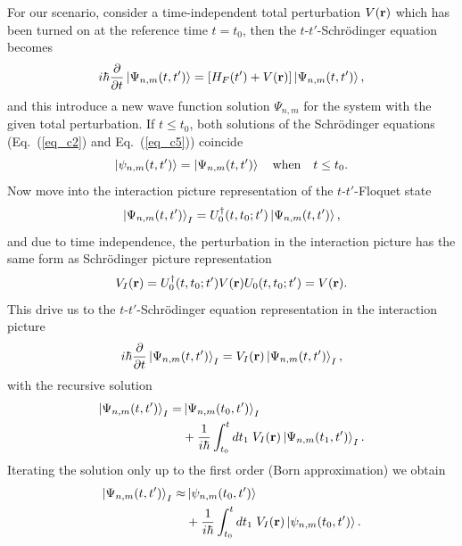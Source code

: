 For our scenario, consider a time-independent total perturbation $V(\vb{r})$ which has been turned on at the reference time $t=t_0$, then the $t$-$t'$-Schrödinger equation becomes
\begin{equation} \label{eq_c5}
  i \hbar \pdv{t}\ket{\Psi_{n,m}(t,t')} =
  \qty[H_F(t') + V(\vb{r})]\ket{\Psi_{n,m}(t,t')},
\end{equation}
and this introduce a new wave function solution $\Psi_{n,m}$ for the system with the given total perturbation. If $t\leq t_0$, both solutions of the Schrödinger equations (Eq.~(\ref{eq_c2}) and Eq.~(\ref{eq_c5})) coincide
\begin{equation} \label{eq_c6}
  \ket{\psi_{n,m}(t,t')} =\ket{\Psi_{n,m}(t,t')} \quad
  \text{when} \quad
  t \leq t_0.
\end{equation}
Now move into the interaction picture representation \cite{bruus04,mahan00} of the $t$-$t'$-Floquet state
\begin{equation} \label{eq_c7}
  \ket{\Psi_{n,m}(t,t')}_I = U_0^{\dagger}(t,t_0;t')
  \ket{\Psi_{n,m}(t,t')},
\end{equation}
and due to time independence, the perturbation in the interaction picture has the same form as Schrödinger picture representation
\begin{equation} \label{eq_c8}
  V_I(\vb{r}) = U_0^{\dagger}(t,t_0;t')V(\vb{r})U_0(t,t_0;t') =
  V(\vb{r}).
\end{equation}
This drive us to the $t$-$t'$-Schrödinger equation representation in the interaction picture
\begin{equation} \label{eq_c9}
  i \hbar \pdv{t}\ket{\Psi_{n,m}(t,t')}_I =
  V_I(\vb{r})\ket{\Psi_{n,m}(t,t')}_I,
\end{equation}
with the recursive solution \cite{bruus04,mahan00}
\begin{equation} \label{eq_c10}
  \begin{aligned}
  \ket{\Psi_{n,m}(t,t')}_I = &\ket{\Psi_{n,m}(t_0,t')}_I \\
  &+
  \frac{1}{i\hbar}
  \int_{t_0}^t dt_1 \;
  V_I(\vb{r}) \ket{\Psi_{n,m}(t_1,t')}_I.
  \end{aligned}
\end{equation}
Iterating the solution only up to the first order (Born approximation) we obtain
\begin{equation} \label{eq_c11}
  \begin{aligned}
    \ket{\Psi_{n,m}(t,t')}_I \approx &\ket{\psi_{n,m}(t_0,t')} \\
    &+
    \frac{1}{i\hbar}
    \int_{t_0}^t dt_1 \;
    V_I(\vb{r}) \ket{\psi_{n,m}(t_0,t')}.
  \end{aligned}
\end{equation}


